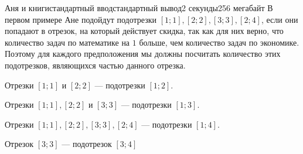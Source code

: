 \begin{problem}{Аня и книги}{стандартный ввод}{стандартный вывод}{2 секунды}{256 мегабайт}
\Note
В первом примере Ане подойдут подотрезки $[1;1], [2;2], [3;3], [2;4]$, если они попадают в отрезок, на который действует скидка, так как для них верно, что количество задач по математике на $1$ больше, чем количество задач по экономике. Поэтому для каждого предположения мы должны посчитать количество этих подотрезков, являющихся частью данного отрезка.

Отрезки $[1;1]$ и $[2;2]$ --- подотрезки $[1; 2]$.

Отрезки $[1;1], [2;2]$ и $[3;3]$ --- подотрезки $[1; 3]$.

Отрезки $[1;1], [2;2], [3;3], [2;4]$ --- подотрезки $[1; 4]$.

Отрезок $[3;3]$ --- подотрезок $[3;4]$

\end{problem}

